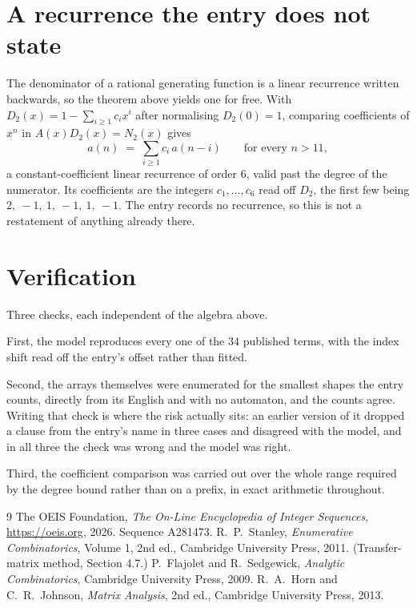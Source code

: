 \documentclass[11pt,a4paper]{article}
\theoremstyle{plain}
\theoremstyle{definition}
\begin{document}
\section{A recurrence the entry does not state}

The denominator of a rational generating function is a linear recurrence written backwards, so
the theorem above yields one for free. With $D_2(x)=1-\sum_{i\ge1}c_ix^i$ after normalising
$D_2(0)=1$, comparing coefficients of $x^n$ in $A(x)D_2(x)=N_2(x)$ gives
\[
a(n)\;=\;\sum_{i\ge1}c_i\,a(n-i)\qquad\text{for every }n>11,
\]
a constant-coefficient linear recurrence of order $6$, valid past the degree of the
numerator. Its coefficients are the integers $c_1,\dots,c_{6}$ read off $D_2$, the first few being $2,\ -1,\ 1,\ -1,\ 1,\ -1$. The entry records no recurrence, so this is not a restatement of anything
already there.

\section{Verification}

Three checks, each independent of the algebra above.

First, the model reproduces every one of the $34$ published terms, with the index shift
read off the entry's offset rather than fitted.

Second, the arrays themselves were enumerated for the smallest shapes the entry counts,
directly from its English and with no automaton, and the counts agree. Writing that check is
where the risk actually sits: an earlier version of it dropped a clause from the entry's name
in three cases and disagreed with the model, and in all three the check was wrong and the model
was right.

Third, the coefficient comparison was carried out over the whole range required by the degree
bound rather than on a prefix, in exact arithmetic throughout.

\begin{thebibliography}{9}
 The OEIS Foundation, \emph{The On-Line Encyclopedia of Integer
Sequences}, \url{https://oeis.org}, 2026. Sequence A281473.
 R.~P.~Stanley, \emph{Enumerative Combinatorics}, Volume 1, 2nd ed.,
Cambridge University Press, 2011. (Transfer-matrix method, Section 4.7.)
 P.~Flajolet and R.~Sedgewick, \emph{Analytic Combinatorics}, Cambridge
University Press, 2009.
 R.~A.~Horn and C.~R.~Johnson, \emph{Matrix Analysis}, 2nd ed., Cambridge
University Press, 2013.
\end{thebibliography}
\end{document}
